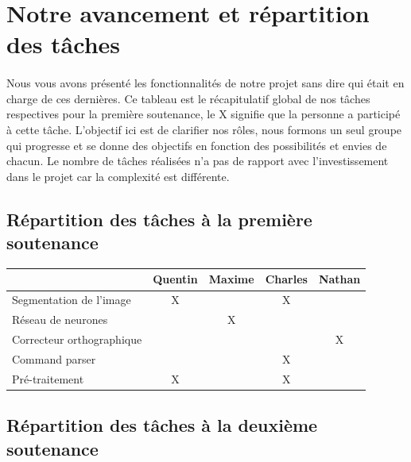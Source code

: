 \documentclass{article}
\begin{document}
\newpage
{}
\section{Notre avancement et répartition des tâches}


\paragraph{} Nous vous avons présenté les fonctionnalités de notre projet sans dire qui était en charge de ces dernières. Ce tableau est le récapitulatif global de nos tâches respectives pour la première soutenance, le X signifie que la personne a participé à cette tâche. L'objectif ici est de clarifier nos rôles, nous formons un seul groupe qui progresse et se donne des objectifs en fonction des possibilités et envies de chacun. Le nombre de tâches réalisées n'a pas de rapport avec l'investissement dans le projet car la complexité est différente.

\subsection{Répartition des tâches à la première soutenance}


\begin{center}
\vspace*{0.2cm}
\begin{tabular}{|l|c|c|c|c|}
  \hline
  & Quentin & Maxime & Charles & Nathan \\
  \hline
  Segmentation de l'image & X &  & X &  \\
  \hline
  Réseau de neurones &  & X &  &  \\
  \hline
  Correcteur orthographique &  &  &  & X \\
  \hline
  Command parser &  & & X &  \\
  \hline
  Pré-traitement & X &  & X & \\
  \hline
\end{tabular}
\end{center}

\vspace*{1cm}

\subsection{Répartition des tâches à la deuxième soutenance}
\end{document}

